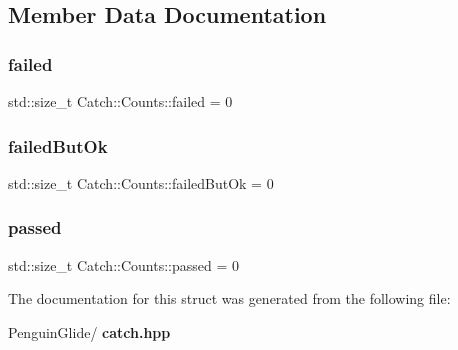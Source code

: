 \subsection{Member Data Documentation}
\mbox{\label{struct_catch_1_1_counts_a19982a3817a3bc2c07f0290e71f497a3}} 
\subsubsection{failed}
{\footnotesize\ttfamily std\+::size\+\_\+t Catch\+::\+Counts\+::failed = 0}

\mbox{\label{struct_catch_1_1_counts_ac090973a2ff51394cd452718e75c073e}} 
\subsubsection{failedButOk}
{\footnotesize\ttfamily std\+::size\+\_\+t Catch\+::\+Counts\+::failed\+But\+Ok = 0}

\mbox{\label{struct_catch_1_1_counts_ad28daaf3de28006400208b6dd0c631e6}} 
\subsubsection{passed}
{\footnotesize\ttfamily std\+::size\+\_\+t Catch\+::\+Counts\+::passed = 0}



The documentation for this struct was generated from the following file\+:\begin{DoxyCompactItemize}
\item 
Penguin\+Glide/\textbf{ catch.\+hpp}\end{DoxyCompactItemize}
